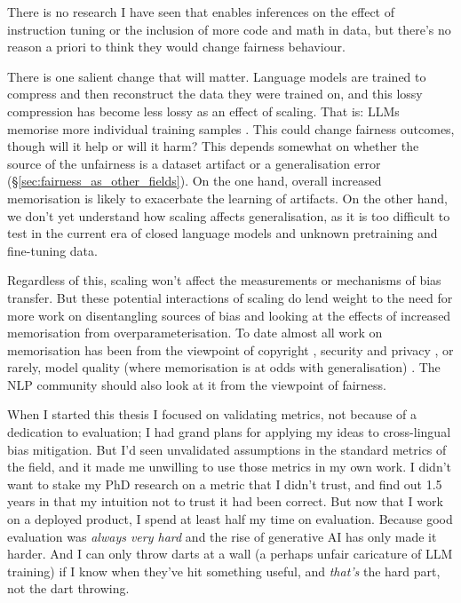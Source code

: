 There is no research I have seen that enables inferences on the effect of instruction tuning or the inclusion of more code and math in data, but there's no reason a priori to think they would change fairness behaviour.  

There is one salient change that will matter. Language models are trained to compress and then reconstruct the data they were trained on, and this lossy compression has become less lossy as an effect of scaling. That is: LLMs memorise more individual training samples \citep{karamolegkou-etal-2023-copyright}. This could change fairness outcomes, though will it help or will it harm? This depends somewhat on whether the source of the unfairness is a dataset artifact or a generalisation error (\S \ref{sec:fairness_as_other_fields}). On the one hand, overall increased memorisation is likely to exacerbate the learning of artifacts. On the other hand, we don't yet understand how scaling affects generalisation, as it is too difficult to test in the current era of closed language models and unknown pretraining and fine-tuning data. 

Regardless of this, scaling won't affect the measurements or mechanisms of bias transfer. But these potential interactions of scaling do lend weight to the need for more work on disentangling sources of bias and looking at the effects of increased memorisation from overparameterisation. To date almost all work on memorisation has been from the viewpoint of copyright \citep{karamolegkou-etal-2023-copyright}, security and privacy \citep{smith2023identifying, hartmann2023sok}, or rarely, model quality (where memorisation is at odds with generalisation) \citep{tanzer-etal-2022-memorisation}. The NLP community should also look at it from the viewpoint of fairness.
 
When I started this thesis I focused on validating metrics, not because of a dedication to evaluation; I had grand plans for applying my ideas to cross-lingual bias mitigation. But I'd seen unvalidated assumptions in the standard metrics of the field, and it made me unwilling to use those metrics in my own work. I didn't want to stake my PhD research on a metric that I didn't trust, and find out 1.5 years in that my intuition not to trust it had been correct. But now that I work on a deployed product, I spend at least half my time on evaluation. Because good evaluation was \textit{always very hard} and the rise of generative AI has only made it harder. And I can only throw darts at a wall (a perhaps unfair caricature of LLM training) if I know when they've hit something useful, and \textit{that's} the hard part, not the dart throwing.

